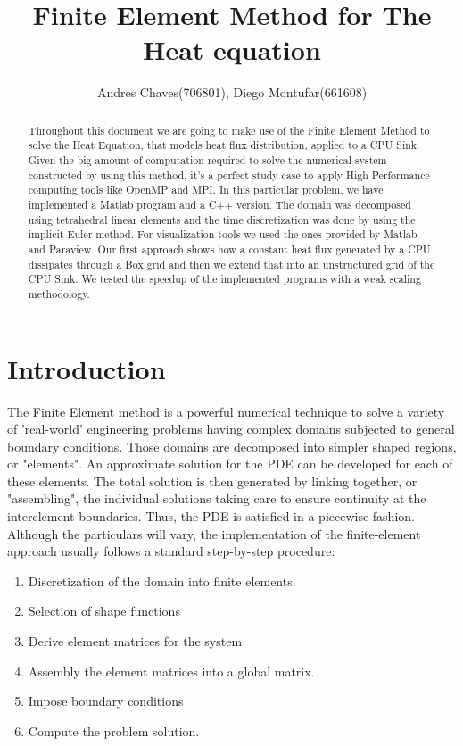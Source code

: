 \documentclass[12pt]{article}
\begin{document}
	\title{Finite Element Method for The Heat equation}
	\author{Andres Chaves(706801), Diego Montufar(661608)}
	
	\maketitle
	
	\begin{abstract}
		Throughout this document we are going to make use of the Finite Element Method to solve the Heat Equation, that models  heat flux distribution, applied to a CPU Sink.  Given the big amount of computation required to solve the numerical system constructed by using this method, it's a perfect study case to apply High Performance computing tools like OpenMP and MPI. In this particular problem, we have implemented a Matlab program and a C++ version. The domain was decomposed using tetrahedral linear elements and the time discretization was done by using the implicit Euler method. For visualization tools we used the ones provided by Matlab and Paraview. Our first approach shows how a constant heat flux generated by a CPU dissipates through a Box grid and then we extend that into an unstructured grid of the CPU Sink. We tested the speedup of the implemented programs with a weak scaling methodology.
	\end{abstract}
	
	\section{Introduction}
	The Finite Element method is a powerful numerical technique to solve a variety of 'real-world' engineering problems having complex domains subjected to general boundary conditions. Those domains are decomposed into simpler shaped regions, or "elements". An approximate solution for the PDE can be developed for each of these elements. The total solution is then generated by linking together, or "assembling", the individual solutions taking care to ensure continuity at the interelement boundaries. Thus, the PDE is satisfied in a piecewise fashion.\\
	
Although the particulars will vary, the implementation of the finite-element approach usually follows a standard step-by-step procedure:\\

\begin{enumerate}
  \item Discretization of the domain into finite elements.
  \item Selection of shape functions
  \item Derive element matrices for the system
  \item Assembly the element matrices into a global matrix.
  \item Impose boundary conditions
  \item Compute the problem solution.
\end{enumerate}
\end{document}
